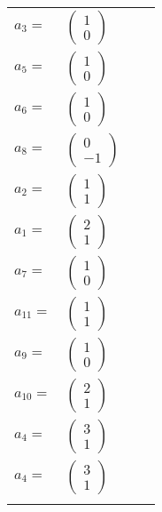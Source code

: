\documentclass[1p]{elsarticle_modified}
\theoremstyle{definition}
\begin{document}
\begin{tabular}{m{7pt} m{180pt} m{7pt} m{180pt} }
\flushright $a_{3}=$&$\begin{pmatrix}1\\0\end{pmatrix}$ \\
\flushright $a_{5}=$&$\begin{pmatrix}1\\0\end{pmatrix}$ \\
\flushright $a_{6}=$&$\begin{pmatrix}1\\0\end{pmatrix}$ \\
\flushright $a_{8}=$&$\begin{pmatrix}0\\-1\end{pmatrix}$ \\
\flushright $a_{2}=$&$\begin{pmatrix}1\\1\end{pmatrix}$ \\
\flushright $a_{1}=$&$\begin{pmatrix}2\\1\end{pmatrix}$ \\
\flushright $a_{7}=$&$\begin{pmatrix}1\\0\end{pmatrix}$ \\
\flushright $a_{11}=$&$\begin{pmatrix}1\\1\end{pmatrix}$ \\
\flushright $a_{9}=$&$\begin{pmatrix}1\\0\end{pmatrix}$ \\
\flushright $a_{10}=$&$\begin{pmatrix}2\\1\end{pmatrix}$ \\
\flushright $a_{4}=$&$\begin{pmatrix}3\\1\end{pmatrix}$\\ \flushright $a_{4}=$&$\begin{pmatrix}3\\1\end{pmatrix}$\\&\end{tabular}
\end{document}
